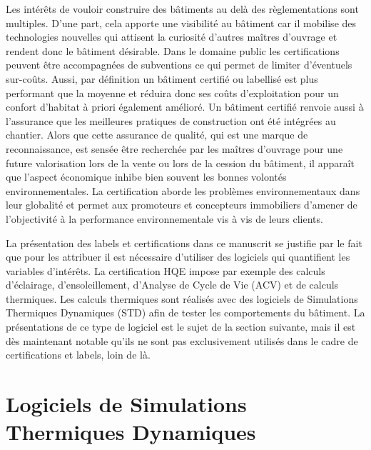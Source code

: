 Les intérêts de vouloir construire des bâtiments au delà des règlementations sont multiples. D'une part, cela apporte une visibilité au bâtiment car il mobilise des technologies nouvelles qui attisent la curiosité d'autres maîtres d'ouvrage et rendent donc le bâtiment désirable. Dans le domaine public les certifications peuvent être accompagnées de subventions ce qui permet de limiter d'éventuels sur-coûts. Aussi, par définition un bâtiment certifié ou labellisé est plus performant que la moyenne et réduira donc ses coûts d'exploitation pour un confort d'habitat à priori également amélioré. Un bâtiment certifié renvoie aussi à l'assurance que les meilleures pratiques de construction ont été intégrées au chantier. Alors que cette assurance de qualité, qui est une marque de reconnaissance, est sensée être recherchée par les maîtres d'ouvrage pour une future valorisation lors de la vente ou lors de la cession du bâtiment, il apparaît que l'aspect économique inhibe bien souvent les bonnes volontés environnementales. La certification aborde les problèmes environnementaux dans leur globalité et permet aux promoteurs et concepteurs immobiliers d'amener de l'objectivité à la performance environnementale vis à vis de leurs clients.

La présentation des labels et certifications dans ce manuscrit se justifie par le fait que pour les attribuer il est nécessaire d'utiliser des logiciels qui quantifient les variables d'intérêts. La certification HQE impose par exemple des calculs d'éclairage, d'ensoleillement, d'Analyse de Cycle de Vie (ACV) et de calculs thermiques. Les calculs thermiques sont réalisés avec des logiciels de Simulations Thermiques Dynamiques (STD) afin de tester les comportements du bâtiment. La présentations de ce type de logiciel est le sujet de la section suivante, mais il est dès maintenant notable qu'ils ne sont pas exclusivement utilisés dans le cadre de certifications et labels, loin de là.

\section{Logiciels de Simulations Thermiques Dynamiques}

